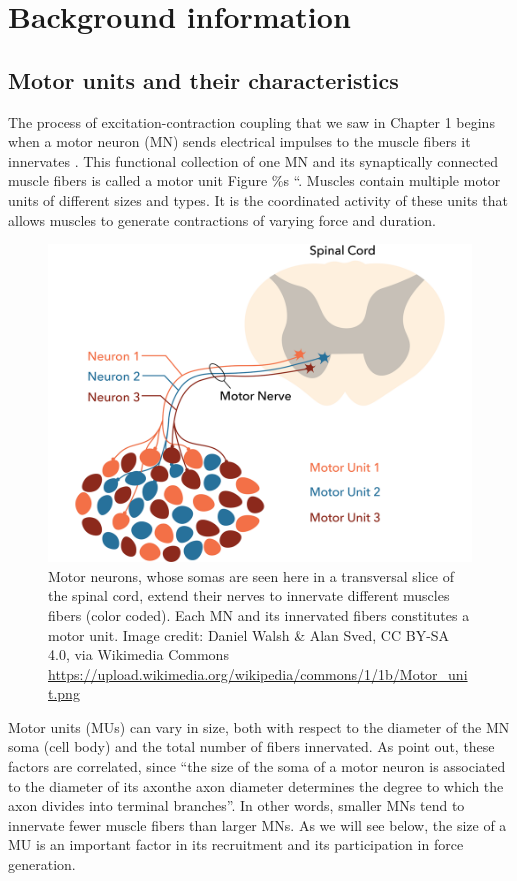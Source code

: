 \documentclass{article}
\begin{document}
\section{Background information}

\subsection{Motor units and their characteristics}

The process of excitation-contraction coupling that we saw in Chapter 1 begins when a motor neuron (MN) sends electrical impulses to the muscle fibers it innervates \citep{schneider2012skeletal, openStax_muscle}. This functional collection of one MN and its synaptically connected muscle fibers is called a motor unit \citep{}Figure \%s ``. Muscles contain multiple motor units of different sizes and types. It is the coordinated activity of these units that allows muscles to generate contractions of varying force and duration.

\begin{figure}[!htbp]
\centering
\includegraphics[width=0.7\linewidth]{files/EPpXta8zJdzN048lz8AR-ea5a4a1e321179708726b68563d91c8a.png}
\caption[]{Motor neurons, whose somas are seen here in a transversal slice of the spinal cord, extend their nerves to innervate different muscles fibers (color coded). Each MN and its innervated fibers constitutes a motor unit. Image credit: Daniel Walsh \& Alan Sved, CC BY-SA 4.0, via Wikimedia Commons \href{https://upload.wikimedia.org/wikipedia/commons/1/1b/Motor\_unit.png}{https://upload.wikimedia.org/wikipedia/commons/1/1b/Motor\_unit.png}}
\label{FpL67ayhha}
\end{figure}

Motor units (MUs) can vary in size, both with respect to the diameter of the MN soma (cell body) and the total number of fibers innervated. As \citet{Dideriksen2013Motor} point out, these factors are correlated, since ``the size of the soma of a motor neuron is associated to the diameter of its axon\dotsand the axon diameter determines the degree to which the axon divides into terminal branches''. In other words, smaller MNs tend to innervate fewer muscle fibers than larger MNs. As we will see below, the size of a MU is an important factor in its recruitment and its participation in force generation.
\end{document}
